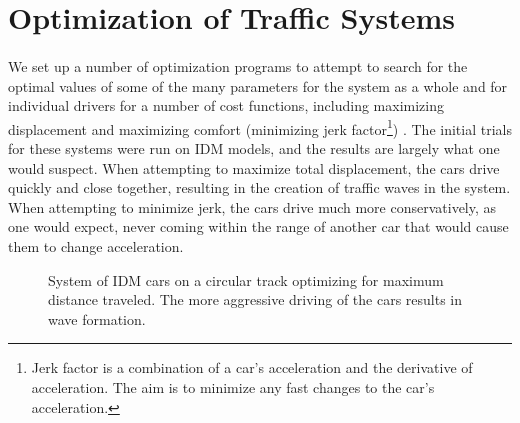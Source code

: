 \documentclass[12pt]{article}
\begin{document}
\section{Optimization of Traffic Systems}
\paragraph{}We set up a number of optimization programs to attempt to search for the optimal values of some of the many parameters for the system as a whole and for individual drivers for a number of cost functions, including maximizing displacement and maximizing comfort (minimizing jerk factor\footnote{Jerk factor is a combination of a car's acceleration and the derivative of acceleration. The aim is to minimize any fast changes to the car's acceleration.}) \cite[chapter~21]{treiber_kesting_2013}. The initial trials for these systems were run on IDM models, and the results are largely what one would suspect. When attempting to maximize total displacement, the cars drive quickly and close together, resulting in the creation of traffic waves in the system. When attempting to minimize jerk, the cars drive much more conservatively, as one would expect, never coming within the range of another car that would cause them to change acceleration. \\

\begin{figure}[H]
  \centering
  \caption{System of IDM cars on a circular track optimizing for maximum distance traveled. The more aggressive driving of the cars results in wave formation.}
\end{figure}
\end{document}
